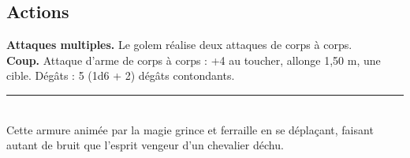 \begin{figure*}[hbp]
{\begin{minipage}[c]{.45\linewidth}
    \subsection*{Actions}
    {\bfseries Attaques multiples.} Le golem réalise deux attaques de corps à corps.\\
    {\bfseries Coup.} Attaque d'arme de corps à corps : +4 au toucher, allonge 1,50 m, une cible. Dégâts : 5 (1d6 + 2) dégâts contondants.\\
    \noindent\rule{\textwidth}{1pt} \\
    Cette armure animée par la magie grince et ferraille en se déplaçant, faisant autant de bruit que l'esprit vengeur d'un chevalier déchu.
  \end{minipage}
}%
\end{figure*}

